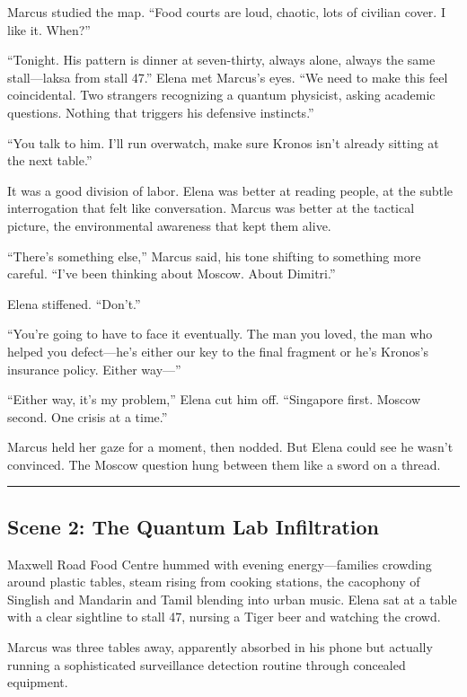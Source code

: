 Marcus studied the map. ``Food courts are loud, chaotic, lots of civilian cover. I like it. When?''

``Tonight. His pattern is dinner at seven-thirty, always alone, always the same stall---laksa from stall 47.'' Elena met Marcus's eyes. ``We need to make this feel coincidental. Two strangers recognizing a quantum physicist, asking academic questions. Nothing that triggers his defensive instincts.''

``You talk to him. I'll run overwatch, make sure Kronos isn't already sitting at the next table.''

It was a good division of labor. Elena was better at reading people, at the subtle interrogation that felt like conversation. Marcus was better at the tactical picture, the environmental awareness that kept them alive.

``There's something else,'' Marcus said, his tone shifting to something more careful. ``I've been thinking about Moscow. About Dimitri.''

Elena stiffened. ``Don't.''

``You're going to have to face it eventually. The man you loved, the man who helped you defect---he's either our key to the final fragment or he's Kronos's insurance policy. Either way---''

``Either way, it's my problem,'' Elena cut him off. ``Singapore first. Moscow second. One crisis at a time.''

Marcus held her gaze for a moment, then nodded. But Elena could see he wasn't convinced. The Moscow question hung between them like a sword on a thread.

\begin{center}\rule{0.5\linewidth}{0.5pt}\end{center}

\hypertarget{scene-2-the-quantum-lab-infiltration}{%
\subsection{Scene 2: The Quantum Lab Infiltration}\label{scene-2-the-quantum-lab-infiltration}}

Maxwell Road Food Centre hummed with evening energy---families crowding around plastic tables, steam rising from cooking stations, the cacophony of Singlish and Mandarin and Tamil blending into urban music. Elena sat at a table with a clear sightline to stall 47, nursing a Tiger beer and watching the crowd.

Marcus was three tables away, apparently absorbed in his phone but actually running a sophisticated surveillance detection routine through concealed equipment.

